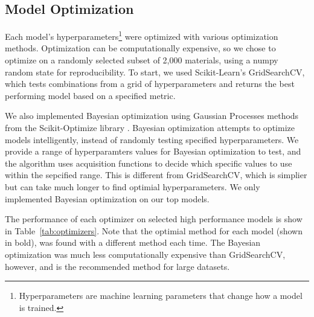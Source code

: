 \documentclass[twocolumn, nofootinbib, secnumarabic, amssymb, nobibnotes, aps, prd]{revtex4-2}
\begin{document}
\subsection{Model Optimization}
Each model's hyperparameters\footnote{Hyperparameters are machine learning parameters that change how a model is trained.} were optimized with various optimization methods. Optimization can be computationally expensive, so we chose to optimize on a randomly selected subset of 2,000 materials, using a numpy random state for reproducibility. To start, we used Scikit-Learn's GridSearchCV, which tests combinations from a grid of hyperparameters and returns the best performing model based on a specified metric. 

We also implemented Bayesian optimization using Gaussian Processes methods from the Scikit-Optimize library \cite{head_tim_2021_5565057}. Bayesian optimization attempts to optimize models intelligently, instead of randomly testing specified hyperparameters. We provide a range of hyperparamters values for Bayesian optimization to test, and the algorithm uses acquisition functions to decide which specific values to use within the sepcified range. This is different from GridSearchCV, which is simplier but can take much longer to find optimial hyperparameters. We only implemented Bayesian optimization on our top models.

The performance of each optimizer on selected high performance models is show in Table~\ref{tab:optimizers}. Note that the optimial method for each model (shown in bold), was found with a different method each time. The Bayesian optimization was much less computationally expensive than GridSearchCV, however, and is the recommended method for large datasets.
\end{document}
